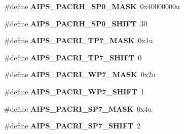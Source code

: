 \begin{DoxyCompactItemize}
\item 
\hypertarget{group___a_i_p_s___register___masks_gab6ed580d07b507f6bf5dcdb0e9bcfd5a}{}\#define {\bfseries A\+I\+P\+S\+\_\+\+P\+A\+C\+R\+H\+\_\+\+S\+P0\+\_\+\+M\+A\+S\+K}~0x40000000u\label{group___a_i_p_s___register___masks_gab6ed580d07b507f6bf5dcdb0e9bcfd5a}

\item 
\hypertarget{group___a_i_p_s___register___masks_ga8e524f1e86a8c6fdad36f680445a8edc}{}\#define {\bfseries A\+I\+P\+S\+\_\+\+P\+A\+C\+R\+H\+\_\+\+S\+P0\+\_\+\+S\+H\+I\+F\+T}~30\label{group___a_i_p_s___register___masks_ga8e524f1e86a8c6fdad36f680445a8edc}

\item 
\hypertarget{group___a_i_p_s___register___masks_gac933f53ace72a51dfca2af1b99912984}{}\#define {\bfseries A\+I\+P\+S\+\_\+\+P\+A\+C\+R\+I\+\_\+\+T\+P7\+\_\+\+M\+A\+S\+K}~0x1u\label{group___a_i_p_s___register___masks_gac933f53ace72a51dfca2af1b99912984}

\item 
\hypertarget{group___a_i_p_s___register___masks_gaf0b52089ffd5e72547a8df691771d7dd}{}\#define {\bfseries A\+I\+P\+S\+\_\+\+P\+A\+C\+R\+I\+\_\+\+T\+P7\+\_\+\+S\+H\+I\+F\+T}~0\label{group___a_i_p_s___register___masks_gaf0b52089ffd5e72547a8df691771d7dd}

\item 
\hypertarget{group___a_i_p_s___register___masks_ga9b95f33134cae02f776172edf177e99f}{}\#define {\bfseries A\+I\+P\+S\+\_\+\+P\+A\+C\+R\+I\+\_\+\+W\+P7\+\_\+\+M\+A\+S\+K}~0x2u\label{group___a_i_p_s___register___masks_ga9b95f33134cae02f776172edf177e99f}

\item 
\hypertarget{group___a_i_p_s___register___masks_ga2efcbc08c7ecd10f34a8af4050ae4cac}{}\#define {\bfseries A\+I\+P\+S\+\_\+\+P\+A\+C\+R\+I\+\_\+\+W\+P7\+\_\+\+S\+H\+I\+F\+T}~1\label{group___a_i_p_s___register___masks_ga2efcbc08c7ecd10f34a8af4050ae4cac}

\item 
\hypertarget{group___a_i_p_s___register___masks_ga8f2c2cabd47eb0ee5ffb1a7575a7e92d}{}\#define {\bfseries A\+I\+P\+S\+\_\+\+P\+A\+C\+R\+I\+\_\+\+S\+P7\+\_\+\+M\+A\+S\+K}~0x4u\label{group___a_i_p_s___register___masks_ga8f2c2cabd47eb0ee5ffb1a7575a7e92d}

\item 
\hypertarget{group___a_i_p_s___register___masks_ga22b22c5f4da74fd5ca7258dcd62409dd}{}\#define {\bfseries A\+I\+P\+S\+\_\+\+P\+A\+C\+R\+I\+\_\+\+S\+P7\+\_\+\+S\+H\+I\+F\+T}~2\label{group___a_i_p_s___register___masks_ga22b22c5f4da74fd5ca7258dcd62409dd}


\end{DoxyCompactItemize}
